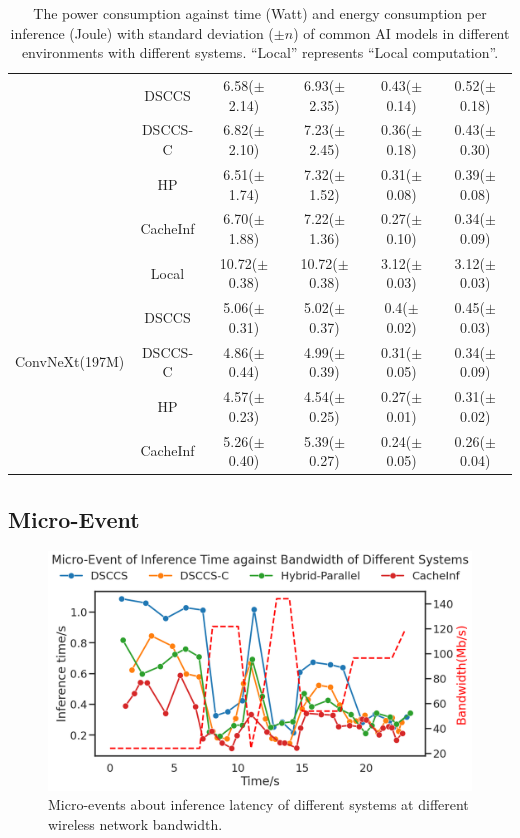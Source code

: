 \begin{table}[htb]
\begin{tabular}{cc|c|c|c|c}
& DSCCS & 6.58($\pm$2.14) & 6.93($\pm$2.35) & 0.43($\pm$0.14) & 0.52($\pm$0.18) \\
 & DSCCS-C & 6.82($\pm$2.10) & 7.23($\pm$2.45) & 0.36($\pm$0.18) & 0.43($\pm$0.30) \\
 & HP & 6.51($\pm$1.74) & 7.32($\pm$1.52) & 0.31($\pm$0.08) & 0.39($\pm$0.08) \\
 & CacheInf & 6.70($\pm$1.88) & 7.22($\pm$1.36) & 0.27($\pm$0.10) & 0.34($\pm$0.09) \\
\cline{1-6}
\multirow[c]{5}{*}{ConvNeXt(197M)} & Local & 10.72($\pm$0.38) & 10.72($\pm$0.38) & 3.12($\pm$0.03) & 3.12($\pm$0.03) \\
& DSCCS & 5.06($\pm$0.31) & 5.02($\pm$0.37) & 0.4($\pm$0.02) & 0.45($\pm$0.03) \\
 & DSCCS-C & 4.86($\pm$0.44) & 4.99($\pm$0.39) & 0.31($\pm$0.05) & 0.34($\pm$0.09) \\
 & HP & 4.57($\pm$0.23) & 4.54($\pm$0.25) & 0.27($\pm$0.01) & 0.31($\pm$0.02) \\
 & CacheInf & 5.26($\pm$0.40) & 5.39($\pm$0.27) & 0.24($\pm$0.05) & 0.26($\pm$0.04) \\
\cline{1-6}
\bottomrule
\end{tabular}
    \caption{The power consumption against time (Watt) and energy consumption per inference (Joule) with standard deviation ($\pm n$) of common AI models in different environments with different systems. ``Local'' represents ``Local computation''.}
    \label{tab:torchvision_power}
\end{table}

\subsection{Micro-Event}
\begin{figure}[htb]
    \includegraphics[width=0.98\linewidth]{fig/MicroEvent2.png}
    \caption[short]{Micro-events about inference latency of different systems at different wireless network bandwidth.}
\end{figure}


